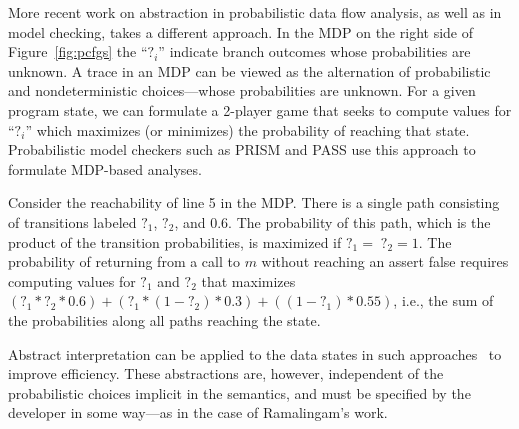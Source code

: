 More recent work on abstraction in probabilistic data flow
analysis, as well as in model checking, takes a different approach.
In the MDP on the right side of Figure~\ref{fig:pcfgs} the ``$?_i$''
indicate branch outcomes whose probabilities are unknown.
A trace in an MDP can be viewed as the alternation of
probabilistic and nondeterministic choices---whose probabilities are unknown.  
For a given program state, we can formulate a 2-player game
that seeks to compute values for ``$?_i$'' which maximizes (or minimizes)
the probability of reaching that state.
Probabilistic model checkers such as PRISM and PASS 
use this approach to formulate MDP-based analyses.

Consider the reachability of line 5 in the MDP.  There is a single
path consisting of transitions labeled $?_1$, $?_2$, and $0.6$.  
The probability of this path, which is the product of the transition
probabilities, is maximized if $?_1 = \; ?_2 = 1$.
The probability of returning from a call to $m$ without reaching
an assert false requires computing values for $?_1$ and $?_2$ that
maximizes $(?_1 * ?_2 * 0.6) + (?_1 * (1 - ?_2) * 0.3) + ((1 - ?_1) * 0.55)$, 
i.e., the sum of the probabilities along all paths reaching the state.

Abstract interpretation can be applied to the data states in
such approaches~\cite{kwiatkowska2011prism,wachter2010best,esparza2011probabilistic}
to improve efficiency.  These abstractions are, however,
independent of the probabilistic choices implicit in the semantics, and must be specified
by the developer in some way---as in the case of Ramalingam's work.
